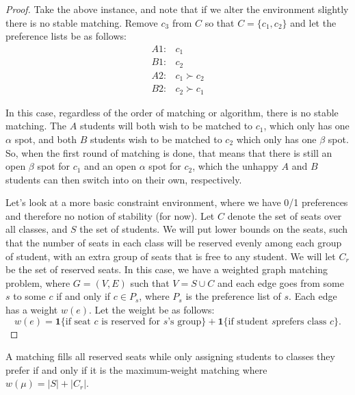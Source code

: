 \begin{proof}
  Take the above instance, and note that if we alter the environment
  slightly there is no stable matching. Remove $c_3$ from $C$ so that $C = \{
    c_1, c_2\}$ and let the preference lists be as follows: \[
    \begin{array}{ll}
      A1: & c_1 \\ B1: & c_2 \\ A2: & c_1 \succ c_2\\ B2: & c_2 \succ
         c_1
    \end{array}
  \]

  In this case, regardless of the order of matching or algorithm, there is no
  stable matching. The $A$ students will both wish to be matched to $c_1$, which
  only has one $\alpha$ spot, and both $B$ students wish to be matched to $c_2$
  which only has one $\beta$ spot. So, when the first round of matching is done,
  that means that there is still an open $\beta$ spot for $c_1$ and an open
  $\alpha$ spot for $c_2$, which the unhappy $A$ and $B$ students can then
  switch into on their own, respectively. \newpage

  Let's look at a more basic constraint environment, where we have 0/1
  preferences and therefore no notion of stability (for now). Let $C$ denote the
  set of seats over all classes, and $S$ the set of students. We will put lower
  bounds on the seats, such that the number of seats in each class will be
  reserved evenly among each group of student, with an extra group of seats that
  is free to any student. We will let $C_r$ be the set of reserved seats. In
  this case, we have a weighted graph matching problem, where $G = (V, E)$ such
  that $V = S \cup C$ and each edge goes from some $s$ to some $c$ if and only
  if $c \in P_s$, where $P_s$ is the preference list of $s$. Each edge has a
  weight $w(e)$. Let the weight be as follows: \[ w(e) = \mathbf{1}\{\text{if
      seat $c$ is reserved for $s$'s group}\} + \mathbf{1}\{\text{if student $s$
      prefers class $c$}\}. \]
\end{proof}

\begin{theorem}
  A matching fills all reserved seats while only assigning students to classes they prefer if and only if it is the maximum-weight matching
  where $w(\mu) = |S| + |C_r|$.
\end{theorem}

